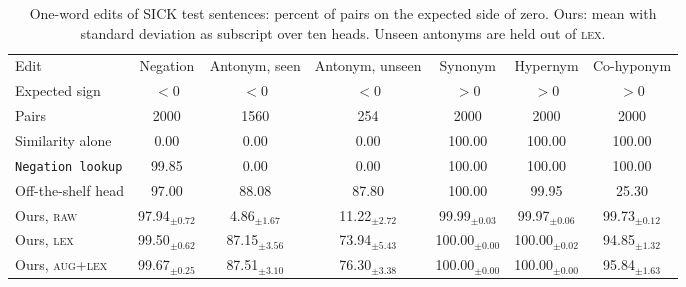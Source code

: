\begin{table}[t]
\centering\small
\begin{tabular}{l cccccc}
\toprule
Edit & Negation & Antonym, seen & Antonym, unseen & Synonym & Hypernym & Co-hyponym \\
Expected sign & $<0$ & $<0$ & $<0$ & $>0$ & $>0$ & $>0$ \\
Pairs & 2000 & 1560 & 254 & 2000 & 2000 & 2000 \\
\midrule
Similarity alone & 0.00 & 0.00 & 0.00 & 100.00 & 100.00 & 100.00 \\
\texttt{Negation lookup} & 99.85 & 0.00 & 0.00 & 100.00 & 100.00 & 100.00 \\
Off-the-shelf head & 97.00 & 88.08 & 87.80 & 100.00 & 99.95 & 25.30 \\
Ours, \textsc{raw} & 97.94$_{\pm 0.72}$ & 4.86$_{\pm 1.67}$ & 11.22$_{\pm 2.72}$ & 99.99$_{\pm 0.03}$ & 99.97$_{\pm 0.06}$ & 99.73$_{\pm 0.12}$ \\
Ours, \textsc{lex} & 99.50$_{\pm 0.62}$ & 87.15$_{\pm 3.56}$ & 73.94$_{\pm 5.43}$ & 100.00$_{\pm 0.00}$ & 100.00$_{\pm 0.02}$ & 94.85$_{\pm 1.32}$ \\
Ours, \textsc{aug+lex} & 99.67$_{\pm 0.25}$ & 87.51$_{\pm 3.10}$ & 76.30$_{\pm 3.38}$ & 100.00$_{\pm 0.00}$ & 100.00$_{\pm 0.00}$ & 95.84$_{\pm 1.63}$ \\
\bottomrule
\end{tabular}
\caption{One-word edits of SICK test sentences: percent of pairs on the expected side of zero. Ours: mean with standard deviation as subscript over ten heads. Unseen antonyms are held out of \textsc{lex}.}
\label{tab:minimal}
\end{table}
